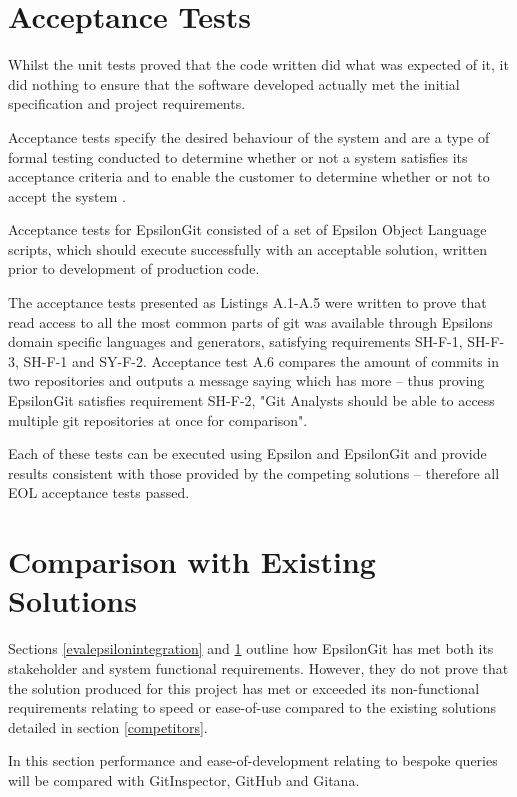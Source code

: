 \documentclass[11pt]{book}
\begin{document}
\section{Acceptance Tests}
\label{evalacceptance}
Whilst the unit tests proved that the code written did what was expected of it, it did nothing to ensure that the software developed actually met the initial specification and project requirements.

Acceptance tests specify the desired behaviour of the system and are a type of formal testing conducted to determine whether or not a system satisfies its acceptance criteria and to enable the customer to determine whether or not to accept the system \cite{acceptancetests1}\cite{acceptancetests2}. 

Acceptance tests for EpsilonGit consisted of a set of Epsilon Object Language scripts, which should execute successfully with an acceptable solution, written prior to development of production code. 

The acceptance tests presented as Listings A.1-A.5 were written to prove that read access to all the most common parts of git was available through Epsilons domain specific languages and generators, satisfying requirements SH-F-1, SH-F-3, SH-F-1 and SY-F-2. Acceptance test A.6 compares the amount of commits in two repositories and outputs a message saying which has more -- thus proving EpsilonGit satisfies requirement SH-F-2, "Git Analysts should be able to access multiple git repositories at once for comparison".

Each of these tests can be executed using Epsilon and EpsilonGit and provide results consistent with those provided by the competing solutions -- therefore all EOL acceptance tests passed.

\section{Comparison with Existing Solutions}
Sections \ref{evalepsilonintegration} and \ref{evalacceptance} outline how EpsilonGit has met both its stakeholder and system functional requirements. However, they do not prove that the solution produced for this project has met or exceeded its non-functional requirements relating to speed or ease-of-use compared to the existing solutions detailed in section \ref{competitors}.

In this section performance and ease-of-development relating to bespoke queries will be compared with GitInspector, GitHub and Gitana.
\end{document}

